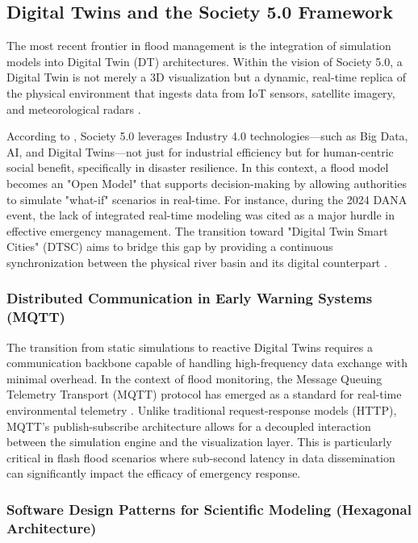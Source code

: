 \subsection{Digital Twins and the Society 5.0 Framework}

The most recent frontier in flood management is the integration of simulation models into Digital Twin (DT) architectures. 
Within the vision of Society 5.0, a Digital Twin is not merely a 3D visualization but a dynamic, real-time replica of the 
physical environment that ingests data from IoT sensors, satellite imagery, and meteorological radars \parencite{FonsecaiCasas2026}.

According to \cite{FonsecaiCasas2026}, Society 5.0 leverages Industry 4.0 technologies—such as Big Data, AI, and Digital 
Twins—not just for industrial efficiency but for human-centric social benefit, specifically in disaster resilience. In this 
context, a flood model becomes an "Open Model" that supports decision-making by allowing authorities to simulate "what-if" 
scenarios in real-time. For instance, during the 2024 DANA event, the lack of integrated real-time modeling was cited as a 
major hurdle in effective emergency management. The transition toward "Digital Twin Smart Cities" (DTSC) 
aims to bridge this gap by providing a continuous synchronization between the physical river basin and its digital counterpart 
\parencite{Mazzetto2024}.


\subsubsection{Distributed Communication in Early Warning Systems (MQTT)}

The transition from static simulations to reactive Digital Twins requires a communication backbone capable of handling high-frequency 
data exchange with minimal overhead. In the context of flood monitoring, the Message Queuing Telemetry Transport (MQTT) protocol has 
emerged as a standard for real-time environmental telemetry \parencite{Dionsio2025}. Unlike traditional request-response models (HTTP), 
MQTT's publish-subscribe architecture allows for a decoupled interaction between the simulation engine and the visualization layer. 
This is particularly critical in flash flood scenarios where sub-second latency in data dissemination can significantly impact the 
efficacy of emergency response.


\subsubsection{Software Design Patterns for Scientific Modeling (Hexagonal Architecture)}

